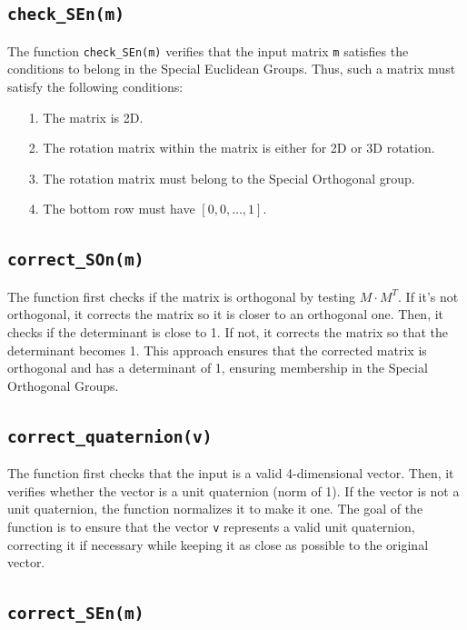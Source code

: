 \documentclass{article}
\begin{document}
\subsection{\texttt{check\_SEn(m)}}

The function \texttt{check\_SEn(m)} verifies that the input matrix \texttt{m} satisfies the conditions to belong in the Special Euclidean Groups. Thus, such a matrix must satisfy the following conditions:
\begin{itemize}
    \item[1.] The matrix is 2D.
    \item[2.] The rotation matrix within the matrix is either for 2D or 3D rotation.
    \item[3.] The rotation matrix must belong to the Special Orthogonal group.
    \item[4.] The bottom row must have $[0, 0, \ldots, 1]$.
\end{itemize}

\subsection{\texttt{correct\_SOn(m)}}

The function first checks if the matrix is orthogonal by testing $M\cdot M^{T}$. If it's not orthogonal, it corrects the matrix so it is closer to an orthogonal one. Then, it checks if the determinant is close to 1. If not, it corrects the matrix so that the determinant becomes 1. This approach ensures that the corrected matrix is orthogonal and has a determinant of 1, ensuring membership in the Special Orthogonal Groups.

\subsection{\texttt{correct\_quaternion(v)}}

The function first checks that the input is a valid 4-dimensional vector.  Then, it verifies whether the vector is a unit quaternion (norm of 1). If the vector is not a unit quaternion, the function normalizes it to make it one. The goal of the function is to ensure that the vector \texttt{v} represents a valid unit quaternion, correcting it if necessary while keeping it as close as possible to the original vector.

\subsection{\texttt{correct\_SEn(m)}}
\end{document}
